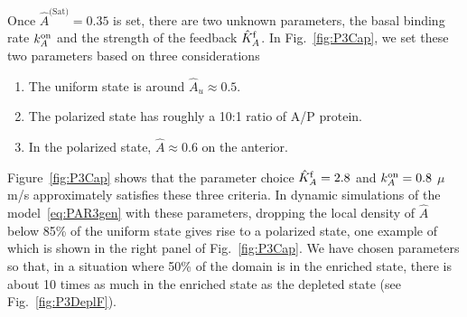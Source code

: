 \documentclass[11pt]{article}
\newcommand{\6}[1]{#1_{\text{6}}}
\newcommand{\3}[1]{#1_{\text{3}}}
\newcommand{\Sat}[1]{#1^\text{(Sat)}}
\begin{document}
Once $\Sat{\hat A}=0.35$ is set, there are two unknown parameters, the basal binding rate $k^\text{on}_A$ and the strength of the feedback $\hat{K}^\text{f}_A$. In Fig.\ \ref{fig:P3Cap}, we set these two parameters based on three considerations
\begin{enumerate}
\item The uniform state is around $\hat A_u \approx 0.5$.
\item The polarized state has roughly a 10:1 ratio of A/P protein.
\item In the polarized state, $\hat A \approx 0.6$ on the anterior.
\end{enumerate}
Figure\ \ref{fig:P3Cap} shows that the parameter choice $\hat{K}^\text{f}_A=2.8$ and $k^\text{on}_A=0.8$ $\mu$m/s approximately satisfies these three criteria. In dynamic simulations of the model\ \eqref{eq:PAR3gen} with these parameters, dropping the local density of $\hat A$ below 85\% of the uniform state gives rise to a polarized state, one example of which is shown in the right panel of Fig.\ \ref{fig:P3Cap}. We have chosen parameters so that, in a situation where 50\% of the domain is in the enriched state, there is about 10 times as much in the enriched state as the depleted state (see Fig.\ \ref{fig:P3DeplF}).
\end{document}
